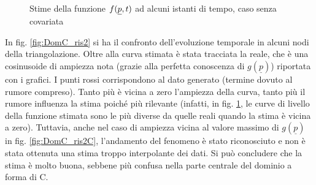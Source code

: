 \documentclass[a4paper,11pt,twoside,openright]{book}							%
\begin{document}
\begin{figure}[H]
{   }
	\caption{Stime della funzione $f(\protect\underline{p},t)$ ad alcuni istanti di tempo, caso senza covariata}
	\label{fig:DomC_ris}
\end{figure}
\newpage
In fig. \ref{fig:DomC_ris2} si ha il confronto dell'evoluzione temporale in alcuni nodi della triangolazione. Oltre alla curva stimata è stata tracciata la reale, che è una cosinusoide di ampiezza nota (grazie alla perfetta conoscenza di $g(\underline p)$) riportata con i grafici. I punti rossi corrispondono al dato generato (termine dovuto al rumore compreso). Tanto più è vicina a zero l'ampiezza della curva, tanto più il rumore influenza la stima poiché più rilevante (infatti, in fig. \ref{fig:DomC_ris}, le curve di livello della funzione stimata sono le più diverse da quelle reali quando la stima è vicina a zero). Tuttavia, anche nel caso di ampiezza vicina al valore massimo di $g(\underline p)$ in fig. \ref{fig:DomC_ris2C}, l'andamento del fenomeno è stato riconosciuto e non è stata ottenuta una stima troppo interpolante dei dati. Si può concludere che la stima è molto buona, sebbene più confusa nella parte centrale del dominio a forma di C.
\end{document}
